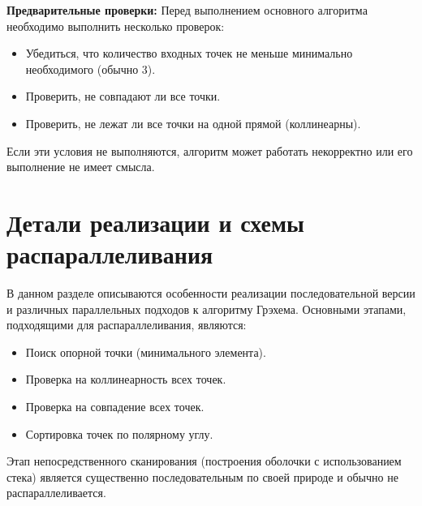 \documentclass[12pt]{article}
\begin{document}
\textbf{Предварительные проверки:}
Перед выполнением основного алгоритма необходимо выполнить несколько проверок:
\begin{itemize}
    \item Убедиться, что количество входных точек не меньше минимально необходимого (обычно 3).
    \item Проверить, не совпадают ли все точки.
    \item Проверить, не лежат ли все точки на одной прямой (коллинеарны). 
\end{itemize}
Если эти условия не выполняются, алгоритм может работать некорректно или его выполнение не имеет смысла.

\newpage
\section{Детали реализации и схемы распараллеливания}

В данном разделе описываются особенности реализации последовательной версии и различных параллельных подходов к алгоритму Грэхема. Основными этапами, подходящими для распараллеливания, являются:
\begin{itemize}
    \item Поиск опорной точки (минимального элемента).
    \item Проверка на коллинеарность всех точек.
    \item Проверка на совпадение всех точек.
    \item Сортировка точек по полярному углу.
\end{itemize}
Этап непосредственного сканирования (построения оболочки с использованием стека) является существенно последовательным по своей природе и обычно не распараллеливается.
\end{document}
